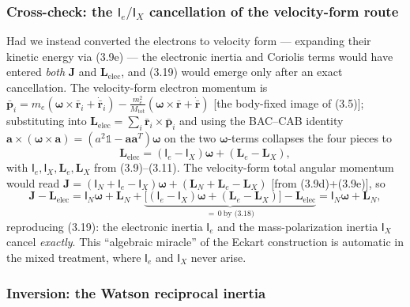 \subsubsection{Cross-check: the $\mathsf{I}_e/\mathsf{I}_X$ cancellation of the velocity-form route}

Had we instead converted the electrons to velocity form --- expanding their kinetic energy via (3.9e) --- the electronic inertia and Coriolis terms would have entered \emph{both} $\mathbf{J}$ and $\mathbf{L}_{\mathrm{elec}}$, and (3.19) would emerge only after an exact cancellation. The velocity-form electron momentum is $\bar{\mathbf{p}}_i=m_e(\boldsymbol{\omega}\!\times\!\bar{\mathbf{r}}_i+\dot{\bar{\mathbf{r}}}_i)-\tfrac{m_e^2}{M_{\mathrm{tot}}}(\boldsymbol{\omega}\!\times\!\bar{\mathbf{r}}+\dot{\bar{\mathbf{r}}})$ [the body-fixed image of (3.5)]; substituting into $\mathbf{L}_{\mathrm{elec}}=\sum_i\bar{\mathbf{r}}_i\!\times\!\bar{\mathbf{p}}_i$ and using the BAC--CAB identity $\mathbf{a}\!\times\!(\boldsymbol{\omega}\!\times\!\mathbf{a})=(a^2\mathbb{1}-\mathbf{a}\mathbf{a}^{T})\boldsymbol{\omega}$ on the two $\boldsymbol{\omega}$-terms collapses the four pieces to
\begin{equation}
\mathbf{L}_{\mathrm{elec}}=(\mathsf{I}_e-\mathsf{I}_X)\boldsymbol{\omega}+(\mathbf{L}_e-\mathbf{L}_X), \tag{3.18}
\end{equation}
with $\mathsf{I}_e,\mathsf{I}_X,\mathbf{L}_e,\mathbf{L}_X$ from (3.9)--(3.11). The velocity-form total angular momentum would read $\mathbf{J}=(\mathsf{I}_N+\mathsf{I}_e-\mathsf{I}_X)\boldsymbol{\omega}+(\mathbf{L}_N+\mathbf{L}_e-\mathbf{L}_X)$ [from (3.9d)+(3.9e)], so
\begin{equation*}
\mathbf{J}-\mathbf{L}_{\mathrm{elec}}=\mathsf{I}_N\boldsymbol{\omega}+\mathbf{L}_N+\underbrace{\bigl[(\mathsf{I}_e-\mathsf{I}_X)\boldsymbol{\omega}+(\mathbf{L}_e-\mathbf{L}_X)\bigr]-\mathbf{L}_{\mathrm{elec}}}_{=\,0\ \text{by (3.18)}}=\mathsf{I}_N\boldsymbol{\omega}+\mathbf{L}_N,
\end{equation*}
reproducing (3.19): the electronic inertia $\mathsf{I}_e$ and the mass-polarization inertia $\mathsf{I}_X$ cancel \emph{exactly}. This ``algebraic miracle'' of the Eckart construction is automatic in the mixed treatment, where $\mathsf{I}_e$ and $\mathsf{I}_X$ never arise.

\subsubsection{Inversion: the Watson reciprocal inertia}

